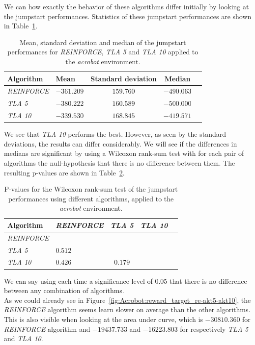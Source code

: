 We can how exactly the behavior of these algorithms differ initially by looking at the jumpstart performances. Statistics of these jumpstart performances are shown in Table~\ref{tab:acrobot:nosparse:stats}.
\begin{table}[htb]
    \centering
    \begin{tabular}{llccc}
    \hline
    Algorithm & Mean & Standard deviation & Median \\
    \hline
       \textit{REINFORCE}  & $-361.209$ & $\bm{159.760}$ & $-490.063$ \\
       \textit{TLA 5} & $-380.222$ & $160.589$ & $-500.000$ \\
       \textit{TLA 10} & $\bm{-339.530}$ & $168.845$ & $\bm{-419.571}$ \\
    \hline
    \end{tabular}
    \caption{Mean, standard deviation and median of the jumpstart performances for \textit{REINFORCE}, \textit{TLA 5} and \textit{TLA 10} applied to the \textit{acrobot} environment.}
    \label{tab:acrobot:nosparse:stats}
\end{table}
We see that \textit{TLA 10} performs the best. However, as seen by the standard deviations, the results can differ considerably. We will see if the differences in medians are significant by using a Wilcoxon rank-sum test with for each pair of algorithms the null-hypothesis that there is no difference between them.
The resulting p-values are shown in Table~\ref{tab:sparse:pvalues}.
\begin{table}[htb]
    \centering
    \begin{tabular}{llccc}
    \hline
    Algorithm & \textit{REINFORCE} & \textit{TLA 5} & \textit{TLA 10} \\
    \hline
       \textit{REINFORCE}  & & & \\
       \textit{TLA 5} & $0.512$ & & \\
       \textit{TLA 10} & $0.426$ & $0.179$ & \\
    \hline
    \end{tabular}
    \caption{P-values for the Wilcoxon rank-sum test of the jumpstart performances using different algorithms, applied to the \textit{acrobot} environment.}
    \label{tab:sparse:pvalues}
\end{table}
We can say using each time a significance level of $0.05$ that there is no difference between any combination of algorithms.\\

As we could already see in Figure~\ref{fig:Acrobot:reward_target_re-akt5-akt10}, the \textit{REINFORCE} algorithm seems learn slower on average than the other algorithms.
This is also visible when looking at the area under curve, which is $-30810.360$ for \textit{REINFORCE} algorithm and $-19437.733$ and $-16223.803$ for respectively \textit{TLA 5} and \textit{TLA 10}.\\

